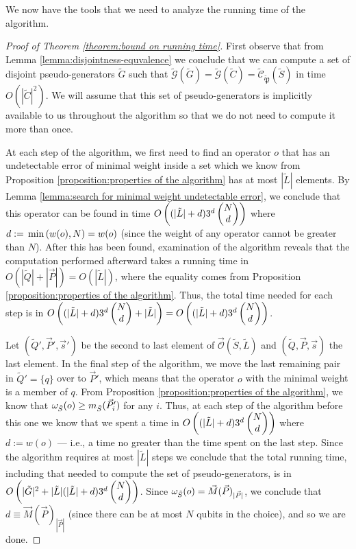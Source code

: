 \documentclass[twocolumn,showpacs,preprintnumbers,amsmath,amssymb,nofootinbib,pra,floatfix]{revtex4-1}
\newenvironment{remark}[1][Remark]{\begin{trivlist}
\item[\hskip \labelsep {\bfseries #1}]}{\end{trivlist}}
\newcommand{\lst}{\vec}
\newcommand{\set}{\tilde}
\newcommand{\genfun}{\tilde{\mathcal{G}}}
\newcommand{\pauligroup}{{\set{\mathfrak{P}}}}
\newcommand{\centralizer}{\set{\mathcal{C}}}
\newcommand{\optimizer}{\lst{\mathcal{O}}}
\begin{document}
\begin{remark}
We now have the tools that we need to analyze the running time of the algorithm.
\end{remark}

\begin{proof}[Proof of Theorem \ref{theorem:bound on running time}]
First observe that from Lemma \ref{lemma:disjointness-equvalence} we conclude that we can compute a set of disjoint pseudo-generators $\set G$ such that $\genfun(\set G)=\genfun(\set C)=\centralizer_\pauligroup(\set S)$ in time $O(|\set C|^2)$.  We will assume that this set of pseudo-generators is implicitly available to us throughout the algorithm so that we do not need to compute it more than once.

At each step of the algorithm, we first need to find an operator $o$ that has an undetectable error of minimal weight inside a set which we know from Proposition \ref {proposition:properties of the algorithm} has at most $|\set L|$ elements.  By Lemma \ref{lemma:search for minimal weight undetectable error}, we conclude that this operator can be found in time $O\paren{(|\set L|+d)3^d\choose{N}{d}}$ where $d:=\,\text{min}\left(w(o),N\right)=w(o)$ (since the weight of any operator cannot be greater than $N$).  After this has been found, examination of the algorithm reveals that the computation performed afterward takes a running time in $O(|\set Q|+|\lst P|)=O(|\set L|)$, where the equality comes from Proposition \ref {proposition:properties of the algorithm}.  Thus, the total time needed for each step is in $O\paren{(|\set L|+d)3^d\choose{N}{d}+|\set L|}=O\paren{(|\set L|+d)3^d\choose{N}{d}}$.

Let $(\set Q',\lst P',\lst s')$ be the second to last element of $\optimizer(\set S,\set L)$ and $(\set Q,\lst P,\lst s)$ the last element.  In the final step of the algorithm, we move the last remaining pair in $\set Q'=\{q\}$ over to $\lst P'$, which means that the operator $o$ with the minimal weight is a member of $q$.  From Proposition \ref {proposition:properties of the algorithm}, we know that $\om_{\set S}(o)\ge m_{\set S}(\lst P'_i)$ for any $i$.  Thus, at each step of the algorithm before this one we know that we spent a time in $O\paren{(|\set L|+d)3^d\choose{N}{d}}$ where $d:=w(o)$ --- i.e., a time no greater than the time spent on the last step.  Since the algorithm requires at most $|\set L|$ steps we conclude that the total running time, including that needed to compute the set of pseudo-generators, is in $O\paren{|\set G|^2+|\set L|(|\set L|+d)3^d\choose{N}{d}}$.  Since $\om_{\set S}(o)=\lst M(\lst P)_{|\lst P|}$, we conclude that $d\equiv\lst M(\lst P)_{|\lst P|}$ (since there can be at most $N$ qubits in the choice), and so we are done.
\end{proof}
\end{document}
